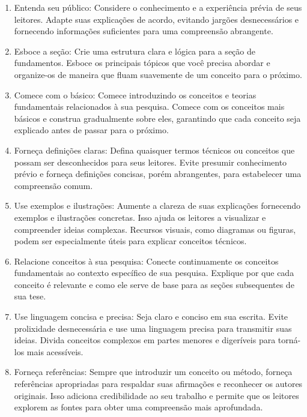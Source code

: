 \documentclass[12pt,a4paper, brazil]{article}
\begin{document}
\begin{enumerate}
    \item Entenda seu público: Considere o conhecimento e a experiência prévia de seus leitores. Adapte suas explicações de acordo, evitando jargões desnecessários e fornecendo informações suficientes para uma compreensão abrangente.

    \item Esboce a seção: Crie uma estrutura clara e lógica para a seção de fundamentos. Esboce os principais tópicos que você precisa abordar e organize-os de maneira que fluam suavemente de um conceito para o próximo.

    \item Comece com o básico: Comece introduzindo os conceitos e teorias fundamentais relacionados à sua pesquisa. Comece com os conceitos mais básicos e construa gradualmente sobre eles, garantindo que cada conceito seja explicado antes de passar para o próximo.

    \item Forneça definições claras: Defina quaisquer termos técnicos ou conceitos que possam ser desconhecidos para seus leitores. Evite presumir conhecimento prévio e forneça definições concisas, porém abrangentes, para estabelecer uma compreensão comum.

    \item Use exemplos e ilustrações: Aumente a clareza de suas explicações fornecendo exemplos e ilustrações concretas. Isso ajuda os leitores a visualizar e compreender ideias complexas. Recursos visuais, como diagramas ou figuras, podem ser especialmente úteis para explicar conceitos técnicos.

    \item Relacione conceitos à sua pesquisa: Conecte continuamente os conceitos fundamentais ao contexto específico de sua pesquisa. Explique por que cada conceito é relevante e como ele serve de base para as seções subsequentes de sua tese.

    \item Use linguagem concisa e precisa: Seja claro e conciso em sua escrita. Evite prolixidade desnecessária e use uma linguagem precisa para transmitir suas ideias. Divida conceitos complexos em partes menores e digeríveis para torná-los mais acessíveis.

    \item Forneça referências: Sempre que introduzir um conceito ou método, forneça referências apropriadas para respaldar suas afirmações e reconhecer os autores originais. Isso adiciona credibilidade ao seu trabalho e permite que os leitores explorem as fontes para obter uma compreensão mais aprofundada.
\end{enumerate}
\end{document}
